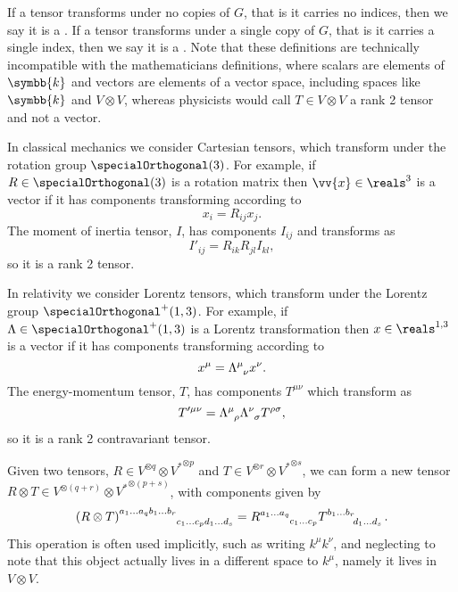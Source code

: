 \documentclass[fleqn]{NotesClass}
\renewcommand{\field}{\symbb{k}}
\newcommand{\dual}[1]{{#1^{*}}}
\newcommand{\lorentzGroup}{\specialOrthogonal^+(1, 3)}
\newcommand{\minkowskiSpace}{\reals^{1,3}}
\begin{document}
    If a tensor transforms under no copies of \(G\), that is it carries no indices, then we say it is a .
    If a tensor transforms under a single copy of \(G\), that is it carries a single index, then we say it is a .
    Note that these definitions are technically incompatible with the mathematicians definitions, where scalars are elements of \(\field\) and vectors are elements of a vector space, including spaces like \(\field\) and \(V \otimes V\), whereas physicists would call \(T \in V \otimes V\) a rank 2 tensor and not a vector.
    
    \begin{exm}{}{}
        In classical mechanics we consider Cartesian tensors, which transform under the rotation group \(\specialOrthogonal(3)\).
        For example, if \(R \in \specialOrthogonal(3)\) is a rotation matrix then \(\vv{x} \in \reals^3\) is a vector if it has components transforming according to
        \begin{equation}
            x_i = R_{ij}x_j.
        \end{equation}
        The moment of inertia tensor, \(I\), has components \(I_{ij}\) and transforms as
        \begin{equation}
            I'_{ij} = R_{ik}R_{jl}I_{kl},
        \end{equation}
        so it is a rank 2 tensor.
        
        In relativity we consider Lorentz tensors, which transform under the Lorentz group \(\lorentzGroup\).
        For example, if \(\Lambda \in \lorentzGroup\) is a Lorentz transformation then \(x \in \minkowskiSpace\) is a vector if it has components transforming according to
        \begin{equation}
            x^\mu = \tensor{\Lambda}{^\mu_\nu}x^\nu.
        \end{equation}
        The energy-momentum tensor, \(T\), has components \(T^{\mu\nu}\) which transform as
        \begin{equation}
            T'^{\mu\nu} = \tensor{\Lambda}{^\mu_\rho}\tensor{\Lambda}{^\nu_\sigma} T^{\rho\sigma},
        \end{equation}
        so it is a rank 2 contravariant tensor.
    \end{exm}
    
    Given two tensors, \(R \in V^{\otimes q} \otimes \dual{V}^{\otimes p}\) and \(T \in V^{\otimes r} \otimes \dual{V}^{\otimes s}\), we can form a new tensor \(R \otimes T \in V^{\otimes(q + r)} \otimes \dual{V}^{\otimes(p + s)}\), with components given by
    \begin{equation}
        \tensor{(R \otimes T)}{^{a_1\dotso a_q b_1 \dotso b_r}_{c_1 \dotso c_p d_1 \dotso d_s}} = \tensor{R}{^{a_1\dotso a_q}_{c_1 \dotso c_p}} \tensor{T}{^{b_1 \dotso b_r}_{d_1 \dotso d_s}}.
    \end{equation}
    This operation is often used implicitly, such as writing \(k^\mu k^\nu\), and neglecting to note that this object actually lives in a different space to \(k^\mu\), namely it lives in \(V \otimes V\).
    
\end{document}

